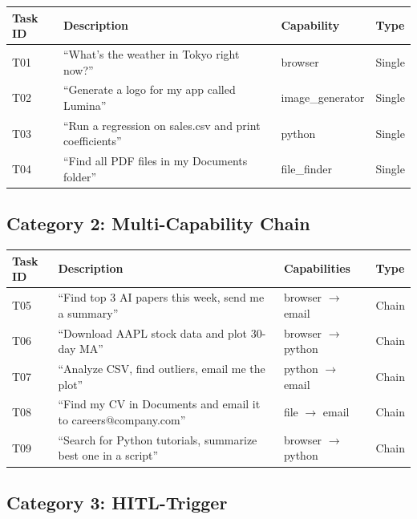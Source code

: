\documentclass[11pt,a4paper]{article}
\begin{document}
\begin{table}[h]
\centering
\small
\begin{tabular}{llll}
\toprule
\textbf{Task ID} & \textbf{Description} & \textbf{Capability} & \textbf{Type} \\
\midrule
T01 & ``What's the weather in Tokyo right now?'' & browser & Single \\
T02 & ``Generate a logo for my app called Lumina'' & image\_generator & Single \\
T03 & ``Run a regression on sales.csv and print coefficients'' & python & Single \\
T04 & ``Find all PDF files in my Documents folder'' & file\_finder & Single \\
\bottomrule
\end{tabular}
\end{table}

\subsection{Category 2: Multi-Capability Chain}

\begin{table}[h]
\centering
\small
\begin{tabular}{llll}
\toprule
\textbf{Task ID} & \textbf{Description} & \textbf{Capabilities} & \textbf{Type} \\
\midrule
T05 & ``Find top 3 AI papers this week, send me a summary'' & browser $\to$ email & Chain \\
T06 & ``Download AAPL stock data and plot 30-day MA'' & browser $\to$ python & Chain \\
T07 & ``Analyze CSV, find outliers, email me the plot'' & python $\to$ email & Chain \\
T08 & ``Find my CV in Documents and email it to careers@company.com'' & file $\to$ email & Chain \\
T09 & ``Search for Python tutorials, summarize best one in a script'' & browser $\to$ python & Chain \\
\bottomrule
\end{tabular}
\end{table}

\subsection{Category 3: HITL-Trigger}
\end{document}

